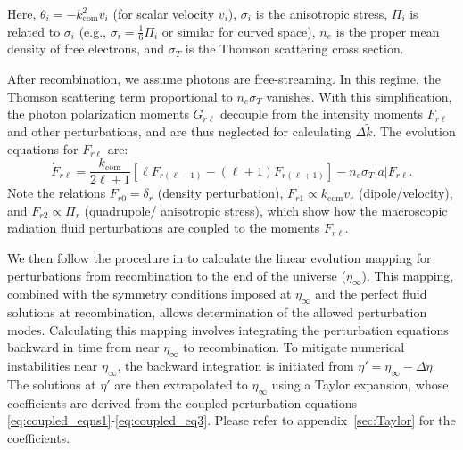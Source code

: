 Here, $\theta_i = -k_{\mathrm{com}}^2 v_i$ (for scalar velocity $v_i$), $\sigma_i$ is the anisotropic stress, $\Pi_i$ is related to $\sigma_i$ (e.g., $\sigma_i = \frac{1}{6}\Pi_i$ or similar for curved space), $n_e$ is the proper mean density of free electrons, and $\sigma_T$ is the Thomson scattering cross section. %

After recombination, we assume photons are free-streaming. In this regime, the Thomson scattering term proportional to $n_e\sigma_T$ vanishes. %
With this simplification, the photon polarization moments $G_{r\ell}$ decouple from the intensity moments $F_{r\ell}$ and other perturbations, and are thus neglected for calculating $\Delta \tilde k$. %
The evolution equations for $F_{r\ell}$ are: %
\begin{equation}\label{eq:coupled_eq3}
    \dot{F}_{r\ell} =\frac{k_{\mathrm{com}}}{2\ell+1}[\ell F_{r(\ell -1)}-(\ell +1)F_{r(\ell+1)}] - n_e\sigma_T |a| F_{r\ell}.
\end{equation}
Note the relations $F_{r0}=\delta_r$ (density perturbation), $F_{r1} \propto k_{\mathrm{com}}v_r$ (dipole/velocity), and $F_{r2} \propto \Pi_r$ (quadrupole/ anisotropic stress), which show how the macroscopic radiation fluid perturbations are coupled to the moments $F_{r\ell}$. %

We then follow the procedure in \cite{2022PhRvD.105l3508P} to calculate the linear evolution mapping for perturbations from recombination to the end of the universe ($\eta_\infty$). %
This mapping, combined with the symmetry conditions imposed at $\eta_\infty$ and the perfect fluid solutions at recombination, allows determination of the allowed perturbation modes. Calculating this mapping involves integrating the perturbation equations backward in time from near $\eta_\infty$ to recombination. To mitigate numerical instabilities near $\eta_\infty$, the backward integration is initiated from $\eta'=\eta_\infty-\Delta \eta$. The solutions at $\eta'$ are then extrapolated to $\eta_\infty$ using a Taylor expansion, whose coefficients are derived from the coupled perturbation equations \cref{eq:coupled_eqns1}-\cref{eq:coupled_eq3}. Please refer to appendix~\cref{sec:Taylor} for the coefficients. %

